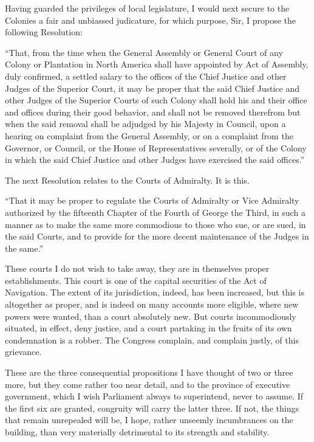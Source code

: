 Having guarded the privileges of local legislature, I would next secure to the Colonies a fair and unbiassed judicature, for which purpose, Sir, I propose the following Resolution:\par

“That, from the time when the General Assembly or General Court of any Colony or Plantation in North America shall have appointed by Act of Assembly, duly confirmed, a settled salary to the offices of the Chief Justice and other Judges of the Superior Court, it may be proper that the said Chief Justice and other Judges of the Superior Courts of such Colony shall hold his and their office and offices during their good behavior, and shall not be removed therefrom but when the said removal shall be adjudged by his Majesty in Council, upon a hearing on complaint from the General Assembly, or on a complaint from the Governor, or Council, or the House of Representatives severally, or of the Colony in which the said Chief Justice and other Judges have exercised the said offices.”\par

The next Resolution relates to the Courts of Admiralty. It is this.\par

“That it may be proper to regulate the Courts of Admiralty or Vice Admiralty authorized by the fifteenth Chapter of the Fourth of George the Third, in such a manner as to make the same more commodious to those who sue, or are sued, in the said Courts, and to provide for the more decent maintenance of the Judges in the same.”\par

These courts I do not wish to take away, they are in themselves proper establishments. This court is one of the capital securities of the Act of Navigation. The extent of its jurisdiction, indeed, has been increased, but this is altogether as proper, and is indeed on many accounts more eligible, where new powers were wanted, than a court absolutely new. But courts incommodiously situated, in effect, deny justice, and a court partaking in the fruits of its own condemnation is a robber. The Congress complain, and complain justly, of this grievance.\par

These are the three consequential propositions I have thought of two or three more, but they come rather too near detail, and to the province of executive government, which I wish Parliament always to superintend, never to assume. If the first six are granted, congruity will carry the latter three. If not, the things that remain unrepealed will be, I hope, rather unseemly incumbrances on the building, than very materially detrimental to its strength and stability.\par

